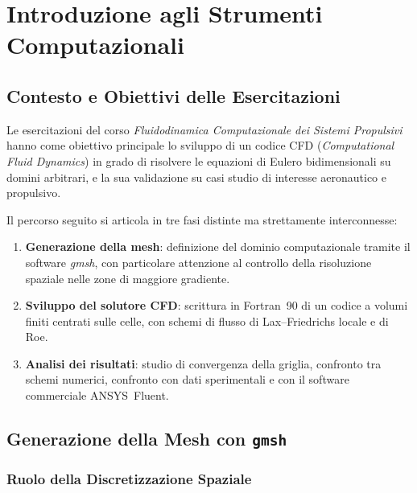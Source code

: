 \chapter{Introduzione agli Strumenti Computazionali}
\label{cap:introduzione}

\section{Contesto e Obiettivi delle Esercitazioni}

Le esercitazioni del corso \textit{Fluidodinamica Computazionale dei Sistemi Propulsivi} hanno
come obiettivo principale lo sviluppo di un codice CFD (\textit{Computational Fluid Dynamics})
in grado di risolvere le equazioni di Eulero bidimensionali su domini arbitrari, e la sua
validazione su casi studio di interesse aeronautico e propulsivo.

Il percorso seguito si articola in tre fasi distinte ma strettamente interconnesse:
\begin{enumerate}
  \item \textbf{Generazione della mesh}: definizione del dominio computazionale tramite il
    software \textit{gmsh}, con particolare attenzione al controllo della risoluzione spaziale
    nelle zone di maggiore gradiente.
  \item \textbf{Sviluppo del solutore CFD}: scrittura in Fortran~90 di un codice a volumi finiti
    centrati sulle celle, con schemi di flusso di Lax--Friedrichs locale e di Roe.
  \item \textbf{Analisi dei risultati}: studio di convergenza della griglia, confronto tra schemi
    numerici, confronto con dati sperimentali e con il software commerciale ANSYS~Fluent.
\end{enumerate}

\section{Generazione della Mesh con \texttt{gmsh}}
\label{sec:gmsh}

\subsection{Ruolo della Discretizzazione Spaziale}

